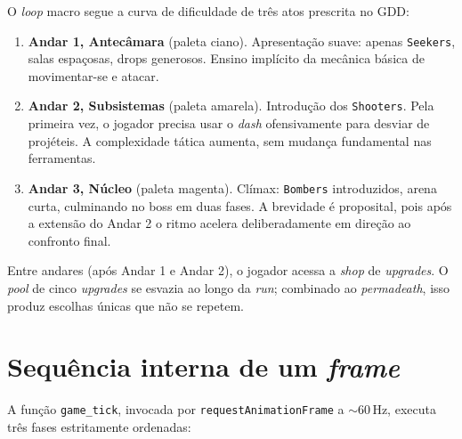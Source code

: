 O \emph{loop} macro segue a curva de dificuldade de três atos prescrita no GDD:

\begin{enumerate}
  \item \textbf{Andar 1, Antecâmara} (paleta ciano). Apresentação suave: apenas
    \texttt{Seekers}, salas espaçosas, drops generosos. Ensino implícito da mecânica
    básica de movimentar-se e atacar.

  \item \textbf{Andar 2, Subsistemas} (paleta amarela). Introdução dos
    \texttt{Shooters}. Pela primeira vez, o jogador precisa usar o \emph{dash}
    ofensivamente para desviar de projéteis. A complexidade tática aumenta, sem
    mudança fundamental nas ferramentas.

  \item \textbf{Andar 3, Núcleo} (paleta magenta). Clímax: \texttt{Bombers}
    introduzidos, arena curta, culminando no boss em duas fases. A brevidade é
    proposital, pois após a extensão do Andar 2 o ritmo acelera deliberadamente em
    direção ao confronto final.
\end{enumerate}

Entre andares (após Andar 1 e Andar 2), o jogador acessa a \emph{shop} de
\emph{upgrades}. O \emph{pool} de cinco \emph{upgrades} se esvazia ao longo da
\emph{run}; combinado ao \emph{permadeath}, isso produz escolhas únicas que não se
repetem.


\section{Sequência interna de um \emph{frame}}

A função \texttt{game\_tick}, invocada por \texttt{requestAnimationFrame} a
$\sim$60\,Hz, executa três fases estritamente ordenadas:

